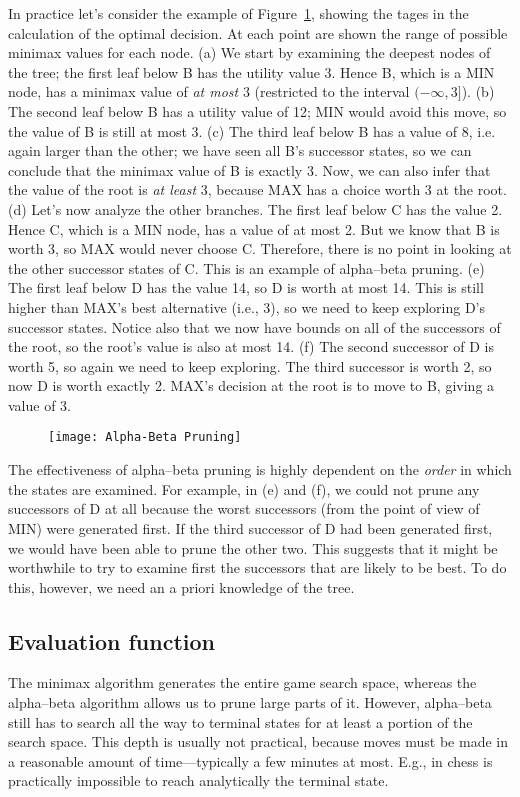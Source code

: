 In practice let's consider the example of Figure~\ref{Alpha-Beta_Pruning}, showing the tages in the calculation of the optimal decision. At each point are shown the range of possible minimax values for each node. (a) We start by examining the deepest nodes of the tree; the first leaf below B has the utility value 3. Hence B, which is a MIN node, has a minimax value of \emph{at most} 3 (restricted to the interval $(-\infty,3]$). (b) The second leaf below B has a utility value of 12; MIN would avoid this move, so the value of B is still at most 3. (c) The third leaf below B has a value of 8, i.e. again larger than the other; we have seen all B's successor states, so we can conclude that the minimax value of B is exactly 3. Now, we can also infer that the value of the root is \emph{at least} 3, because MAX has a choice worth 3 at the root. (d) Let's now analyze the other branches. The first leaf below C has the value 2. Hence C, which is a MIN node, has a value of at most 2. But we know that B is worth 3, so MAX would never choose C. Therefore, there is no point in looking at the other successor states of C. This is an example of alpha–beta pruning. (e) The first leaf below D has the value 14, so D is worth at most 14. This is still higher than MAX's best alternative (i.e., 3), so we need to keep exploring D's successor states. Notice also that we now have bounds on all of the successors of the root, so the root's value is also at most 14. (f) The second successor of D is worth 5, so again we need to keep exploring. The third successor is worth 2, so now D is worth exactly 2. MAX's decision at the root is to move to B, giving a value of 3.
\begin{figure}[h!t]
\centering
\texttt{[image: Alpha-Beta Pruning]}
\caption{}\label{Alpha-Beta_Pruning}
\end{figure}

The effectiveness of alpha–beta pruning is highly dependent on the \emph{order} in which the states are examined. For example, in (e) and (f), we could not prune any successors of D at all because the worst successors (from the point of view of MIN) were generated first. If the third successor of D had been generated first, we would have been able to prune the other two. This suggests that it might be worthwhile to try to examine first the successors that are likely to be best. To do this, however, we need an a priori knowledge of the tree.
\subsection{Evaluation function}
The minimax algorithm generates the entire game search space, whereas the alpha–beta algorithm allows us to prune large parts of it. However, alpha–beta still has to search all the way to terminal states for at least a portion of the search space. This depth is usually not practical, because moves must be made in a reasonable amount of time—typically a few minutes at most. E.g., in chess is practically impossible to reach analytically the terminal state.

